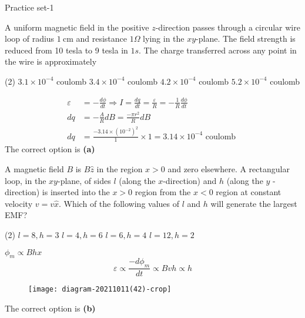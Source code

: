 \begin{abox}
	Practice set-1 
	\end{abox}
\begin{enumerate}
\begin{minipage}{\textwidth}
	\item A uniform magnetic field in the positive $z$-direction passes through a circular wire loop of radius $1 \mathrm{~cm}$ and resistance $1 \Omega$ lying in the $x y$-plane. The field strength is reduced from 10 tesla to 9 tesla in $1 s$. The charge transferred across any point in the wire is approximately
\end{minipage}
\begin{tasks}(2)
	\task[\textbf{A.}]$3.1 \times 10^{-4}$ coulomb
	\task[\textbf{B.}] $3.4 \times 10^{-4}$ coulomb
	\task[\textbf{C.}] $4.2 \times 10^{-4}$ coulomb
	\task[\textbf{D.}]$5.2 \times 10^{-4}$ coulomb
\end{tasks}
\begin{answer}	
 \begin{align*}
 \varepsilon&=-\frac{d \phi}{d t} \Rightarrow I=\frac{d q}{d t}=\frac{\varepsilon}{R}=-\frac{1}{R} \frac{d \phi}{d t} \\
 d q&=-\frac{A}{R} d B=\frac{-\pi r^{2}}{R} d B \\
 d q&=\frac{-3.14 \times\left(10^{-2}\right)^{2}}{1} \times 1=3.14 \times 10^{-4} \text { coulomb }
 \end{align*}	
	The correct option is \textbf{(a)}	
\end{answer}
\begin{minipage}{\textwidth}
	\item A magnetic field $B$ is $B \hat{z}$ in the region $x>0$ and zero elsewhere. A rectangular loop, in the $x y$-plane, of sides $l$ (along the $x$-direction) and $h$ (along the $y$ - direction) is inserted into the $x>0$ region from the $x<0$ region at constant velocity $v=v \hat{x}$. Which of the following values of $l$ and $h$ will generate the largest EMF?
\end{minipage}
\begin{tasks}(2)
	\task[\textbf{A.}] $l=8, h=3$
	\task[\textbf{B.}]$l=4, h=6$
	\task[\textbf{C.}]$l=6, h=4$
	\task[\textbf{D.}]$l=12, h=2$
\end{tasks}
\begin{answer}
	$\phi_{m} \propto B h x$
	$$
	\varepsilon \propto \frac{-d \phi_{m}}{d t} \propto B v h \propto h
	$$
	\begin{figure}[H]
		\centering
		\texttt{[image: diagram-20211011(42)-crop]}
	\end{figure}
	The correct option is \textbf{(b)}	
\end{answer}
\end{enumerate}
